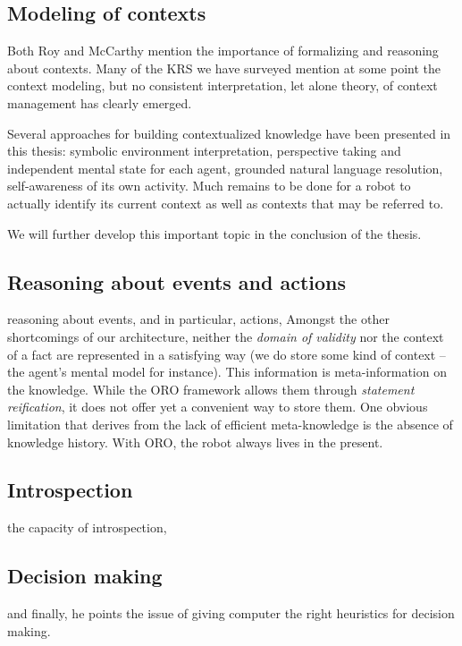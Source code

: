 \subsection{Modeling of contexts}

Both Roy and McCarthy mention the importance of formalizing and reasoning about
contexts. Many of the KRS we have surveyed mention at some point the context
modeling, but no consistent interpretation, let alone theory, of context
management has clearly emerged.

Several approaches for building contextualized knowledge have been presented in
this thesis: symbolic environment interpretation, perspective taking and
independent mental state for each agent, grounded natural language resolution,
self-awareness of its own activity. Much remains to be done for a robot to
actually identify its current context as well as contexts that may be referred
to.

We will further develop this important topic in the conclusion of the thesis.

\subsection{Reasoning about events and actions}

reasoning about events, and in particular, actions,
Amongst the other shortcomings of our architecture, neither the \emph{domain of
validity} nor the context of a fact are represented in a satisfying way (we do
store some kind of context --the agent's mental model for instance). This
information is meta-information on the knowledge. While the ORO framework
allows them through \emph{statement reification}, it does not offer yet a
convenient way to store them. One obvious limitation that derives from the lack
of efficient meta-knowledge is the absence of knowledge history.  With ORO, the
robot always lives in the present.


\subsection{Introspection}

the capacity of introspection,

\subsection{Decision making}

and finally, he points the issue of giving computer the right heuristics for
decision making.

